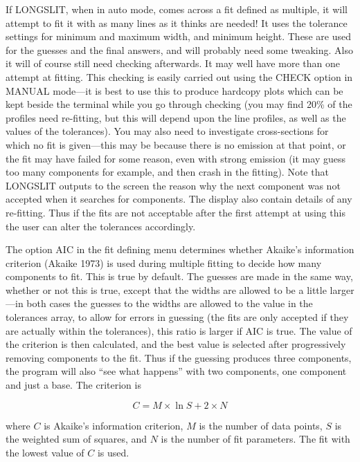 \documentclass[11pt,twoside]{article}
\begin{document}
If LONGSLIT, when in auto mode, comes across a fit defined as
multiple, it will attempt to fit it with as many lines as it thinks
are needed!  It uses the tolerance settings for minimum and maximum
width, and minimum height.  These are used for the guesses and the
final answers, and will probably need some tweaking.  Also it will of
course still need checking afterwards.  It may well have more than one
attempt at fitting. This checking is easily carried out using the
CHECK option in MANUAL mode---it is best to use this to produce
hardcopy plots which can be kept beside the terminal while you go
through checking (you may find 20\% of the profiles need re-fitting,
but this will depend upon the line profiles, as well as the values of
the tolerances). You may also need to investigate cross-sections for
which no fit is given---this may be because there is no emission at
that point, or the fit may have failed for some reason, even with
strong emission (it may guess too many components for example, and
then crash in the fitting).  Note that LONGSLIT outputs to the screen
the reason why the next component was not accepted when it searches
for components. The display also contain details of any re-fitting.
Thus if the fits are not acceptable after the first attempt at using
this the user can alter the tolerances accordingly.

The option AIC in the fit defining menu determines whether Akaike's
information criterion (Akaike 1973) is used during multiple
fitting to decide how many components to fit.  This is true by
default.  The guesses are made in the same way, whether or not this is
true, except that the widths are allowed to be a little larger---in
both cases the guesses to the widths are allowed to the value in the
tolerances array, to allow for errors in guessing (the fits are only
accepted if they are actually within the tolerances), this ratio is
larger if AIC is true.  The value of the criterion is then calculated,
and the best value is selected after progressively removing components
to the fit.  Thus if the guessing produces three components, the
program will also ``see what happens'' with two components, one
component and just a base. The criterion is

\begin{equation}
C = M \times \ln S + 2 \times N
\end{equation}

where $C$ is Akaike's information criterion, $M$ is the number of data
points, $S$ is the weighted sum of squares, and $N$ is the number of fit
parameters.
The fit with the lowest value of $C$ is used.
\end{document}
